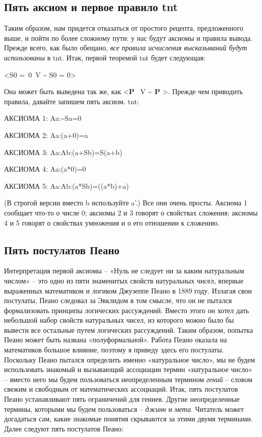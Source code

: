 \documentclass[../main.tex]{subfiles}
\begin{document}
\subsection{Пять аксиом и первое правило \acs{tnt}}

Таким образом, нам придется отказаться от простого рецепта, предложенного выше, и пойти по более сложному пути: у нас будут аксиомы и правила вывода. Прежде всего, как было обещано, \emph{все правила исчисления высказываний будут использованы} в \acs{tnt}. Итак, первой теоремой \acs{tnt} будет следующая:

\textless S0 =~0~V \textasciitilde{} S0 = 0\textgreater{}

Она может быть выведена так же, как \textless{}\textbf{P} ~V \textbf{\textasciitilde{} P} \textgreater. Прежде чем приводить правила, давайте запишем пять аксиом. \acs{tnt}:

АКСИОМА 1: Aa:\textasciitilde Sa=0

АКСИОМА 2: Aa:(a+0)=a

АКСИОМА 3: Aa:Ab:(a+Sb)=S(a+b)

АКСИОМА 4: Aa:(a*0)=0

АКСИОМА 5: Aa:Ab:(a*Sb)=((a*b)+a)

(В строгой версии вместо b используйте a'.) Все они очень просты. Аксиома 1 сообщает что-то о числе 0; аксиомы 2 и 3 говорят о свойствах сложения; аксиомы 4 и 5 говорят о свойствах умножения и о его отношении к сложению.


\subsection{Пять постулатов Пеано}

Интерпретация первой аксиомы \--- «Нуль не следует ни за каким натуральным числом» \--- это одно из пяти знаменитых свойств натуральных чисел, впервые выраженных математиком и логиком Джузеппе Пеано в 1889 году. Излагая свои постулаты, Пеано следовал за Эвклидом в том смысле, что он не пытался формализовать принципы логических рассуждений. Вместо этого он хотел дать небольшой набор свойств натуральных чисел, из которого можно было бы вывести все остальные путем логических рассуждений. Таким образом, попытка Пеано может быть названа «полуформальной». Работа Пеано оказала на математиков большое влияние, поэтому я приведу здесь его постулаты. Поскольку Пеано пытался определить именно «натуральное число», мы не будем использовать знакомый и вызывающий ассоциации термин «натуральное число» \--- вместо него мы будем пользоваться неопределенным термином \emph{гений} \--- словом свежим и свободным от математических ассоциаций. Итак, пять постулатов Пеано устанавливают пять ограничений для гениев. Другие неопределенные термины, которыми мы будем пользоваться \--- \emph{джинн} и \emph{мета}. Читатель может догадаться сам, какие знакомые понятия скрываются за этими двумя терминами. Далее следуют пять постулатов Пеано:
\end{document}
